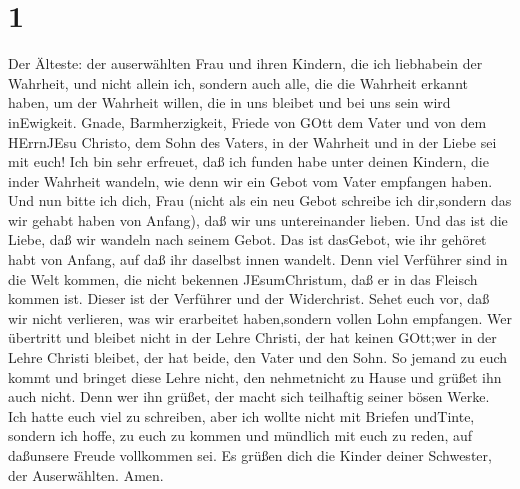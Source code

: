 \hypertarget{section}{%
\section{1}\label{section}}

 Der Älteste: der auserwählten Frau und ihren Kindern, die
ich liebhabein der Wahrheit, und nicht allein ich, sondern auch alle,
die die Wahrheit erkannt haben,  um der Wahrheit willen, die
in uns bleibet und bei uns sein wird inEwigkeit.  Gnade,
Barmherzigkeit, Friede von GOtt dem Vater und von dem HErrnJEsu Christo,
dem Sohn des Vaters, in der Wahrheit und in der Liebe sei mit euch!
 Ich bin sehr erfreuet, daß ich funden habe unter deinen
Kindern, die inder Wahrheit wandeln, wie denn wir ein Gebot vom Vater
empfangen haben.  Und nun bitte ich dich, Frau (nicht als
ein neu Gebot schreibe ich dir,sondern das wir gehabt haben von Anfang),
daß wir uns untereinander lieben.  Und das ist die Liebe,
daß wir wandeln nach seinem Gebot. Das ist dasGebot, wie ihr gehöret
habt von Anfang, auf daß ihr daselbst innen wandelt.  Denn
viel Verführer sind in die Welt kommen, die nicht bekennen
JEsumChristum, daß er in das Fleisch kommen ist. Dieser ist der
Verführer und der Widerchrist.  Sehet euch vor, daß wir
nicht verlieren, was wir erarbeitet haben,sondern vollen Lohn empfangen.
 Wer übertritt und bleibet nicht in der Lehre Christi, der
hat keinen GOtt;wer in der Lehre Christi bleibet, der hat beide, den
Vater und den Sohn.  So jemand zu euch kommt und bringet
diese Lehre nicht, den nehmetnicht zu Hause und grüßet ihn auch nicht.
 Denn wer ihn grüßet, der macht sich teilhaftig seiner
bösen Werke.  Ich hatte euch viel zu schreiben, aber ich
wollte nicht mit Briefen undTinte, sondern ich hoffe, zu euch zu kommen
und mündlich mit euch zu reden, auf daßunsere Freude vollkommen sei.
 Es grüßen dich die Kinder deiner Schwester, der
Auserwählten. Amen.
